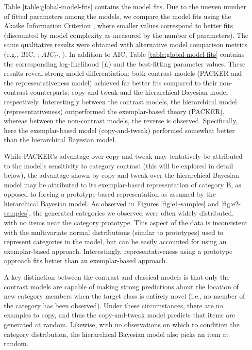 \documentclass[pdflatex,sn-apa]{sn-jnl}%
\theoremstyle{thmstyleone}%
\theoremstyle{thmstyletwo}%
\theoremstyle{thmstylethree}%
\begin{document}
Table \ref{table:global-model-fits} contains the model fits. Due to the uneven number of fitted parameters among the models, we
compare the model fits using the Akaike Information Criterion
\citep[AIC;][]{akaike1974new}, where smaller values correspond to better fits
(discounted by model complexity as measured by the number of parameters). The
same qualitative results were obtained with alternative model comparison metrics
(e.g., BIC, \citealp{schwarz1978estimating}; $AIC_C$,
\citealp{hurvich1989regression}). In addition to AIC, Table \ref{table:global-model-fits} contains the corresponding log-likelihood ($L$) and the best-fitting
parameter values. These results reveal strong model differentiation: both
contrast models (PACKER and the representativeness model) achieved far better
fits compared to their non-contrast counterparts: copy-and-tweak and the
hierarchical Bayesian model respectively. Interestingly between the contrast
models, the hierarchical model (representativeness) outperformed the
exemplar-based theory (PACKER), whereas between the non-contrast models, the
reverse is observed. Specifically, here the exemplar-based model
(copy-and-tweak) performed somewhat better than the hierarchical Bayesian model.

While PACKER's advantage over copy-and-tweak may tentatively be attributed to
the model's sensitivity to category contrast (this will be explored in detail
below), the advantage shown by copy-and-tweak over the hierarchical Bayesian
model may be attributed to its exemplar-based representation of category B, as
opposed to forcing a prototype-based representation as assumed by the
hierarchical Bayesian model. As observed in Figures \ref{fig:e1-samples} and
\ref{fig:e2-samples}, the generated categories we observed were often widely
distributed, with no items near the category prototype. This aspect of the data
is inconsistent with the multivariate normal distributions (similar to
prototypes) used to represent categories in the \cite{jern2013probabilistic}
model, but can be easily accounted for using an exemplar-based approach.
Interestingly, representativeness using a prototype approach fits better than an
exemplar-based approach. 

A key distinction between the contrast and classical models is that only the
contrast models are capable of making strong predictions about the location of
new category members when the target class is entirely novel (i.e., no member of
the category has been observed). Under these circumstances, there are no
examples to copy, and thus the copy-and-tweak model predicts that items are
generated at random. Likewise, with no observations on which to condition the
category distribution, the hierarchical Bayesian model also picks an item at
random.
\end{document}
